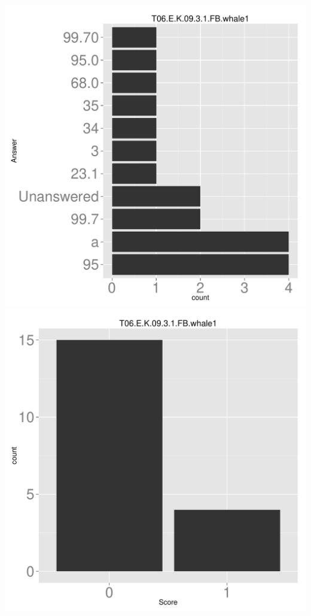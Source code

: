 \documentclass[12pt,english,nohyper]{tufte-handout}\usepackage[]{graphicx}\usepackage[]{color}
\begin{document}
\begin{center} \includegraphics[width=.45\linewidth]{Topic06_AB_27_answer} \includegraphics[width=.45\linewidth]{Topic06_AB_27_score} \end{center} 
\end{document}
